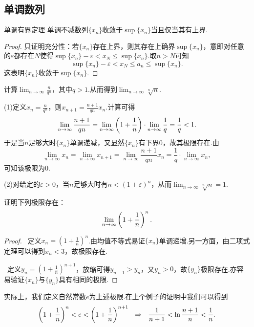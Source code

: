 \subsection{单调数列}

\begin{theorem}{单调有界定理}
	单调不减数列$\{ x_n \}$收敛于$\sup \{ x_n \}$当且仅当其有上界.
\end{theorem}
\begin{proof}
	只证明充分性：若$\{ x_n \}$存在上界，则其存在上确界$\sup \{ x_n \}$，意即对任意的$\varepsilon$都存在$N$使得$\sup \{x_n\}-\varepsilon < x_N \leq \sup \{ x_n \}$.取$n>N$可知$$\sup \{x_n\}-\varepsilon < x_N \leq a_n \leq \sup \{ x_n \}.$$
	这表明$\{ x_n \}$收敛于$\sup \{ x_n \}$.
\end{proof}

\begin{example}
	计算$\lim_{n\to \infty} \frac{n}{q^n}$，其中$q>1$.从而得到$\lim_{n\to \infty} \sqrt[n]{n}$.
\end{example}
\begin{solution}
	(1)定义$x_n=\frac{n}{q^n}$，则$x_{n+1}=\frac{n+1}{qn}x_n$.计算可得$$\lim_{n \to \infty} \frac{n+1}{qn} = \lim_{n \to \infty} \left( 1+\frac{1}{n} \right) \cdot \lim_{n \to \infty} \frac{1}{q} = \frac{1}{q} < 1.$$
	于是当$n$足够大时$\{ x_n \}$单调递减，又显然$\{ x_n \}$有下界$0$，故其极限存在.由$$\lim_{n \to \infty} x_{n} = \lim_{n \to \infty} x_{n+1} = \lim_{n \to \infty} \frac{n+1}{qn} x_n = \frac{1}{q} \cdot \lim_{n \to \infty} x_n,$$可知该极限为$0$.
	
	(2)对给定的$\varepsilon > 0$，当$n$足够大时有$n<(1+\varepsilon)^n$，从而$\lim_{n\to \infty} \sqrt[n]{n} =1$.
\end{solution}

\begin{example}
	证明下列极限存在：$$\lim_{n\to \infty} \left( 1+\frac{1}{n} \right)^n.$$
\end{example}
\begin{proof}
	~定义$x_n=(1+\frac{1}{n})^n$.由均值不等式易证$\{ x_n \}$单调递增.另一方面，由二项式定理可以得到$x_n<3$，故极限存在.
	
	~定义$y_n=(1+\frac{1}{n})^{n+1}$，放缩可得$y_{n-1}>y_n$，又$y_n>0$，故$\{ y_n \}$极限存在.亦容易验证$\{ x_n \}$与$\{ y_n \}$具有相同的极限.
\end{proof}

实际上，我们定义自然常数$e$为上述极限.在上个例子的证明中我们可以得到$$\left( 1+\frac{1}{n} \right)^n < e < \left( 1+\frac{1}{n} \right)^{n+1} ~~\Rightarrow ~~ \frac{1}{n+1} < \ln \frac{n+1}{n} < \frac{1}{n}.$$

